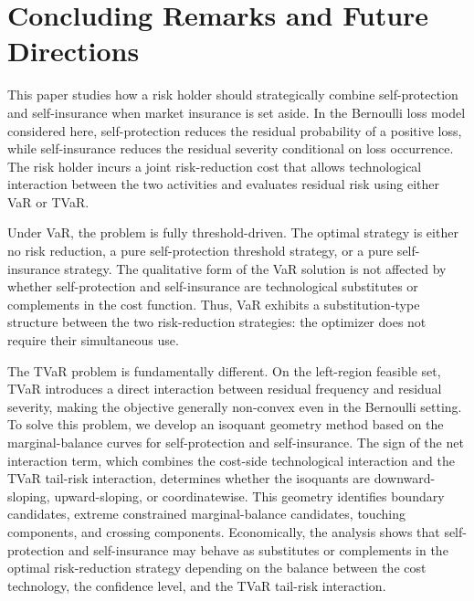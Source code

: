 \documentclass[a4paper,12pt]{article}
\begin{document}

\section{Concluding Remarks and Future Directions}\label{sec:conclusion}

This paper studies how a risk holder should strategically combine self-protection and self-insurance when market insurance is set aside. In the Bernoulli loss model considered here, self-protection reduces the residual probability of a positive loss, while self-insurance reduces the residual severity conditional on loss occurrence. The risk holder incurs a joint risk-reduction cost that allows technological interaction between the two activities and evaluates residual risk using either VaR or TVaR.

Under VaR, the problem is fully threshold-driven. The optimal strategy is either no risk reduction, a pure self-protection threshold strategy, or a pure self-insurance strategy. The qualitative form of the VaR solution is not affected by whether self-protection and self-insurance are technological substitutes or complements in the cost function. Thus, VaR exhibits a substitution-type structure between the two risk-reduction strategies: the optimizer does not require their simultaneous use.

The TVaR problem is fundamentally different. On the left-region feasible set, TVaR introduces a direct interaction between residual frequency and residual severity, making the objective generally non-convex even in the Bernoulli setting. To solve this problem, we develop an isoquant geometry method based on the marginal-balance curves for self-protection and self-insurance. The sign of the net interaction term, which combines the cost-side technological interaction and the TVaR tail-risk interaction, determines whether the isoquants are downward-sloping, upward-sloping, or coordinatewise. This geometry identifies boundary candidates, extreme constrained marginal-balance candidates, touching components, and crossing components. Economically, the analysis shows that self-protection and self-insurance may behave as substitutes or complements in the optimal risk-reduction strategy depending on the balance between the cost technology, the confidence level, and the TVaR tail-risk interaction.
\end{document}
